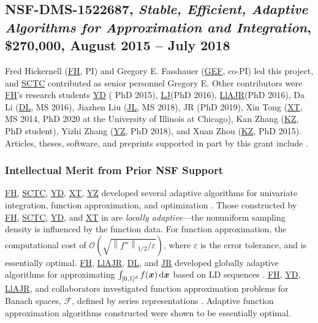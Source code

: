 \documentclass[11pt]{NSFamsart}
\newcommand{\FH}{\hyperlink{FHlink}{FH}\xspace}
\newcommand{\SCTC}{\hyperlink{SCTClink}{SCTC}\xspace}
\newcommand{\GEF}{\hyperlink{GEFlink}{GEF}\xspace}
\newcommand{\YD}{\hyperlink{YDlink}{YD}\xspace}
\newcommand{\JR}{\hyperlink{JRlink}{JR}\xspace}
\newcommand{\LlAJR}{\hyperlink{LlAJRlink}{LlAJR}\xspace}
\newcommand{\LJ}{\hyperlink{LJlink}{LJ}\xspace}
\newcommand{\XT}{\hyperlink{XTlink}{XT}\xspace}
\newcommand{\KZ}{\hyperlink{KZlink}{KZ}\xspace}
\newcommand{\DL}{\hyperlink{DLlink}{DL}\xspace}
\newcommand{\XZ}{\hyperlink{XZlink}{KZ}\xspace}
\newcommand{\JL}{\hyperlink{JLlink}{JL}\xspace}
\newcommand{\YZ}{\hyperlink{YZlink}{YZ}\xspace}
\newcommand{\bx}{{\boldsymbol{x}}}
\def\dif{\textup{d}}
\newcommand{\calf}{{\mathcal{F}}}
\newcommand{\norm}[2][{}]{\ensuremath{\left \lVert #2 \right \rVert}_{#1}}
\newcommand{\Order}{\mathcal{O}}
\begin{document}
\subsection{NSF-DMS-1522687, \emph{Stable, Efficient, Adaptive Algorithms for
		Approximation and Integration},
	\$270,000, August 2015 -- July 2018} \label{sec:PreviousFred}
Fred Hickernell (\FH, PI) and Gregory E. Fasshauer (\GEF, co-PI) led this project, and \SCTC contributed as senior personnel
Gregory E.  Other contributors were \FH's research students {\YD} ( PhD 2015), \LJ (PhD 2016),
\LlAJR (PhD 2016), \hypertarget{DLlink}{Da Li} (\DL, MS 2016), \hypertarget{JLlink}{Jiazhen Liu} (\JL, MS 2018), JR (PhD 2019), \hypertarget{XTlink}{Xin Tong} (\XT, MS 2014, PhD 2020 at the University of Illinois at Chicago), \hypertarget{KZlink}{Kan Zhang} (\KZ, PhD student), \hypertarget{YZlink}{Yizhi Zhang} (\YZ, PhD 2018), and \hypertarget{XZlink}{Xuan Zhou} (\XZ, PhD 2015).  Articles, theses,
software, and preprints supported in
part by this
grant
include
\cite{ala_augmented_2017,
	ChoEtal17a,
	ChoEtal21a,
	Din15a,
	DinHic20a,
	GilEtal16a,
	Hic17a,
	HicJag18b,
	HicJim16a,
	HicEtal18a,
	HicEtal17a,
	HicKriWoz19a,
	RatHic19a,
	GilJim16b,
	JimHic16a,
	JohFasHic18a,
	Li16a,
	Liu17a,
	MarEtal18a,
	mccourt_stable_2017,
	MCCEtal19a,
	mishra_hybrid_2018,
	MisEtal19a,
	rashidinia_stable_2016,
	rashidinia_stable_2018,
	Zha18a,
	Zha17a,
	Zho15a,
	ZhoHic15a}.

\subsubsection{Intellectual Merit from Prior NSF Support}
\label{previousmeritsubsec}

\FH, \SCTC, \YD, \XT, \YZ developed several adaptive algorithms for univariate integration, function approximation, and optimization \cite{ChoEtal17a,HicEtal14b,  Din15a, Ton14a, Zha18a}.  Those constructed by \FH, \SCTC, \YD, and \XT in \cite{ChoEtal17a} are \emph{locally adaptive}---the nonuniform sampling density is influenced by the function data.  For function approximation, the computational cost of $\Order\left(\sqrt{\norm[1/2]{f''}/\varepsilon} \right)$, where $\varepsilon$ is the error tolerance, and is essentially optimal. 
\FH, \LlAJR, \DL, and \JR developed globally adaptive algorithms for approximating $\int_{[0,1]^d} f(\bx) \, \dif \bx$ based on LD sequences \cite{HicJim16a,HicEtal17a,JimHic16a}. 
\FH, \YD, \LlAJR, and collaborators investigated function approximation problems for Banach spaces, $\calf$, defined by series representations \cite{DinHic20a,DinEtal20a}.  Adaptive function approximation algorithms constructed were shown to be essentially optimal.
\end{document}
